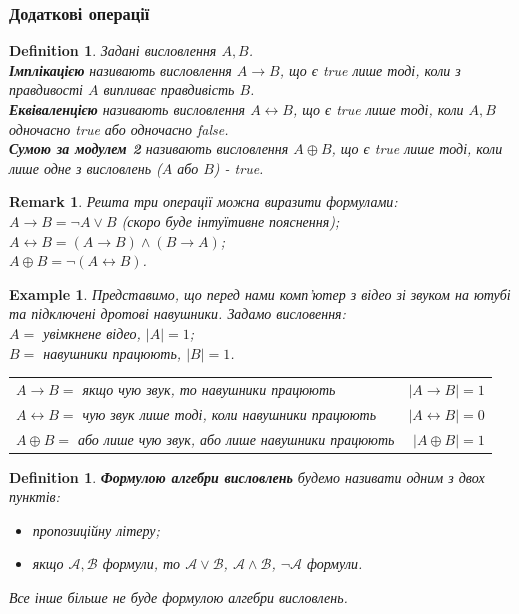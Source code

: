\documentclass[a4paper, 14pt]{extarticle}
\theoremstyle{theoremdd}
\theoremstyle{theoremdd}
\newtheorem{definition}[theorem]{Definition}
\theoremstyle{theoremdd}
\theoremstyle{theoremdd}
\theoremstyle{theoremdd}
\newtheorem{example}[theorem]{Example}
\theoremstyle{theoremdd}
\theoremstyle{theoremdd}
\theoremstyle{theoremdd}
\theoremstyle{theoremdd}
\theoremstyle{theoremdd}
\theoremstyle{theoremdd}
\newtheorem{remark}[theorem]{Remark}
\theoremstyle{theoremdd}
\theoremstyle{theoremdd}
\theoremstyle{theoremdd}
\theoremstyle{theoremdd}
\begin{document}
\subsubsection*{Додаткові операції}
\begin{definition}
Задані висловлення $A,B$.\\
\textbf{Імплікацією} називають висловлення $A \rightarrow B$, що є true лише тоді, коли з правдивості $A$ випливає правдивість $B$.
\\
\textbf{Еквіваленцією} називають висловлення $A \leftrightarrow B$, що є true лише тоді, коли $A,B$ одночасно true або одночасно false.
\\
\textbf{Сумою за модулем 2} називають висловлення $A \oplus B$, що є true лише тоді, коли лише одне з висловлень ($A$ або $B$) - true.
\end{definition}

\begin{remark}
Решта три операції можна виразити формулами:\\
$A \rightarrow B = \neg A \vee B$ (скоро буде інтуїтивне пояснення);\\
$A \leftrightarrow B = (A \rightarrow B) \wedge (B \rightarrow A)$;\\
$A \oplus B = \neg(A \leftrightarrow B)$.
\end{remark}

\begin{example} Представимо, що перед нами комп'ютер з відео зі звуком на ютубі та підключені дротові навушники. Задамо висловення:\\
$A = $ увімкнене відео, $|A| = 1$; \\
$B = $ навушники працюють, $|B| = 1$.\\
\begin{tabular}{lr}
$A \rightarrow B =$ якщо чую звук, то навушники працюють & $|A \rightarrow B| = 1$\\
$A \leftrightarrow B =$ чую звук лише тоді, коли навушники працюють & $|A \leftrightarrow B| = 0$\\
$A \oplus B =$ або лише чую звук, або лише навушники працюють & $|A \oplus B| = 1$
\end{tabular}
\end{example}

\begin{definition}
\textbf{Формулою алгебри висловлень} будемо називати одним з двох пунктів:
\begin{itemize}[nosep,wide=0pt,label={-}]
\item  пропозиційну літеру;
\item якщо $\mathcal{A}, \mathcal{B}$ формули, то $\mathcal{A} \vee \mathcal{B}$, $\mathcal{A} \wedge \mathcal{B}$, $\neg \mathcal{A}$ формули.
\end{itemize}
Все інше більше не буде формулою алгебри висловлень.
\end{definition}
\end{document}
